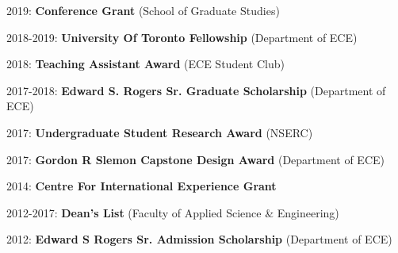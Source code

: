 \documentclass[12pt]{cv_style}
\begin{document}
\begin{ditem}
	\item 2019: \textbf{Conference Grant} (School of Graduate Studies)
	\item 2018-2019: \textbf{University Of Toronto Fellowship} (Department of ECE)
	\item 2018: \textbf{Teaching Assistant Award} (ECE Student Club)
	\item 2017-2018: \textbf{Edward S. Rogers Sr. Graduate Scholarship} (Department of ECE)
	\item 2017: \textbf{Undergraduate Student Research Award} (NSERC)
	\item 2017: \textbf{Gordon R Slemon Capstone Design Award} (Department of ECE)
	\item 2014: \textbf{Centre For International Experience Grant}
	\item 2012-2017: \textbf{Dean's List} (Faculty of Applied Science \& Engineering)
	\item 2012: \textbf{Edward S Rogers Sr. Admission Scholarship} (Department of ECE)
\end{ditem}
\end{document}
